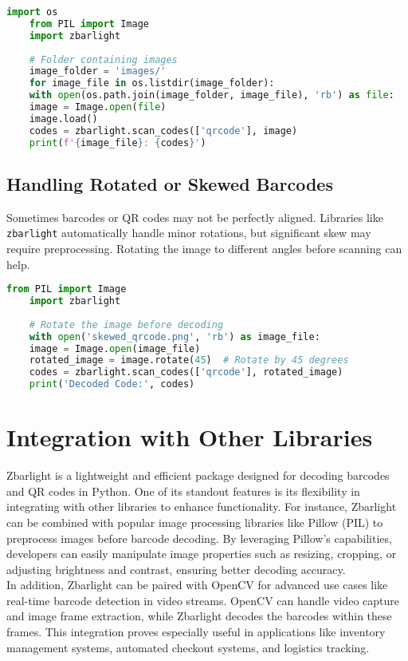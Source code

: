 \begin{lstlisting}[language=Python]
	import os
	from PIL import Image
	import zbarlight
	
	# Folder containing images
	image_folder = 'images/'
	for image_file in os.listdir(image_folder):
	with open(os.path.join(image_folder, image_file), 'rb') as file:
	image = Image.open(file)
	image.load()
	codes = zbarlight.scan_codes(['qrcode'], image)
	print(f'{image_file}: {codes}')
\end{lstlisting}

\subsection{Handling Rotated or Skewed Barcodes}
Sometimes barcodes or QR codes may not be perfectly aligned. Libraries like \texttt{zbarlight} automatically handle minor rotations, but significant skew may require preprocessing. Rotating the image to different angles before scanning can help.\cite{zbarlightgithub:2024}

\begin{lstlisting}[language=Python]
	from PIL import Image
	import zbarlight
	
	# Rotate the image before decoding
	with open('skewed_qrcode.png', 'rb') as image_file:
	image = Image.open(image_file)
	rotated_image = image.rotate(45)  # Rotate by 45 degrees
	codes = zbarlight.scan_codes(['qrcode'], rotated_image)
	print('Decoded Code:', codes)
\end{lstlisting}

\section{Integration with Other Libraries}
Zbarlight is a lightweight and efficient package designed for decoding barcodes and QR codes in Python. One of its standout features is its flexibility in integrating with other libraries to enhance functionality. For instance, Zbarlight can be combined with popular image processing libraries like Pillow (PIL) to preprocess images before barcode decoding. By leveraging Pillow’s capabilities, developers can easily manipulate image properties such as resizing, cropping, or adjusting brightness and contrast, ensuring better decoding accuracy.\cite{zbarlightpypi:2024} \\

In addition, Zbarlight can be paired with OpenCV for advanced use cases like real-time barcode detection in video streams. OpenCV can handle video capture and image frame extraction, while Zbarlight decodes the barcodes within these frames. This integration proves especially useful in applications like inventory management systems, automated checkout systems, and logistics tracking.\cite{opencv_documentation:2024} \\

